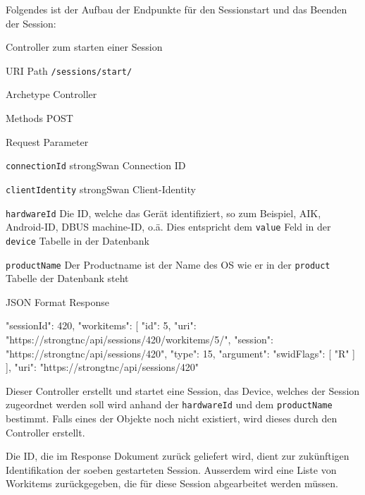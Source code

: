 Folgendes ist der Aufbau der Endpunkte für den Sessionstart und das Beenden der
Session:

\begin{listing}[H]
\caption{Controller zum starten einer Session}
\begin{mdframed}[style=def]
\begin{description*}
	\item[URI Path] \texttt{/sessions/start/}
	\item[Archetype] Controller
	\item[Methods] POST
	\item[Request Parameter] \hfill
	\begin{description*}
		\item[\texttt{connectionId}] strongSwan Connection ID
		\item[\texttt{clientIdentity}] strongSwan Client-Identity
		\item[\texttt{hardwareId}] Die ID, welche das Gerät identifiziert, so zum
		Beispiel, AIK, Android-ID, DBUS machine-ID, o.ä. Dies entspricht dem
		\texttt{value} Feld in der \texttt{device} Tabelle in der Datenbank
		\item[\texttt{productName}] Der Productname ist der Name des OS wie er in der
		\texttt{product} Tabelle der Datenbank steht
	\end{description*}
	\item[JSON Format Response] \hfill
\begin{jsoncode}
{
	"sessionId": 420,
	"workitems": [
		 {
		 	"id": 5,
		 	"uri": "https://strongtnc/api/sessions/420/workitems/5/",
		 	"session": "https://strongtnc/api/sessions/420",
		 	"type": 15,
		 	"argument": {
		 		"swidFlags": [
		 			"R"
		 		]
		 	}
		 }
	],
	"uri": "https://strongtnc/api/sessions/420"
}
\end{jsoncode}
\end{description*}
\end{mdframed}
\end{listing}

Dieser Controller erstellt und startet eine Session, das Device, welches der
Session zugeordnet werden soll wird anhand der \texttt{hardwareId} und dem
\texttt{productName} bestimmt. Falls eines der Objekte noch nicht existiert, wird
dieses durch den Controller erstellt.

Die ID, die im Response Dokument zurück geliefert wird, dient zur zukünftigen
Identifikation der soeben gestarteten Session. Ausserdem wird eine Liste von
Workitems zurückgegeben, die für diese Session abgearbeitet werden müssen.

